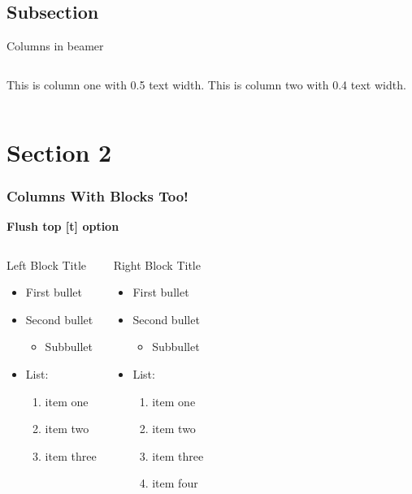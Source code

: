 \documentclass[aspectratio=1610,professionalfonts]{beamer}
\begin{document}
\subsection{Subsection}
\begin{frame}{Columns in beamer}
    \begin{columns}
        \centering
        This is column one with 0.5 text width.
        \centering
        This is column two with 0.4 text width.
    \end{columns}
\end{frame}



\section{Section 2}
\begin{frame}[t]
  \frametitle{Columns With Blocks Too!}

  \textbf{Flush top [t] option}

  \begin{columns}[t]
    \begin{block}{Left Block Title}
    \begin{itemize}
    \item First bullet
    \item Second bullet
      \begin{itemize}
      \item Subbullet
      \end{itemize}
    \item List:
      \begin{enumerate}
      \item item one
      \item item two
      \item item three
      \end{enumerate}
    \end{itemize}
    \end{block}
    \begin{block}{Right Block Title}
    \begin{itemize}
    \item First bullet
    \item Second bullet
      \begin{itemize}
      \item Subbullet
      \end{itemize}
    \item List:
      \begin{enumerate}
      \item item one
      \item item two
      \item item three
      \item item four
      \end{enumerate}
    \end{itemize}
    \end{block}
  \end{columns}
\end{frame}
\end{document}
